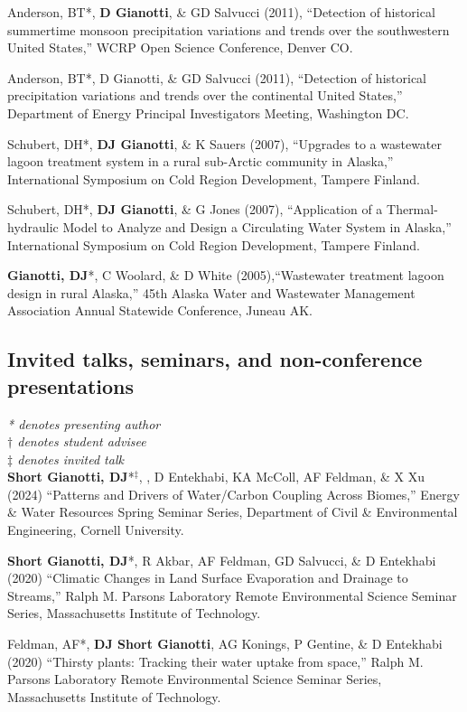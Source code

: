 \documentclass[10pt, a4paper]{article}
\renewcommand{\emph}[1]{\textit{#1}}
\newcommand{\lbr}{\vspace*{12pt}}
\newcommand{\years}[1]{\mbox{}\marginnote{\scriptsize #1}} %
\begin{document}
\years{2011}Anderson, BT*, \textbf{D Gianotti}, \& GD Salvucci (2011), ``Detection of historical summertime monsoon precipitation variations and trends over the southwestern United States,'' WCRP Open Science Conference, Denver CO.\lbr

\years{2011}Anderson, BT*, D Gianotti, \& GD Salvucci (2011), ``Detection of historical precipitation variations and trends over the continental United States,'' Department of Energy Principal Investigators Meeting, Washington DC.\lbr

\years{2007}Schubert, DH*, \textbf{DJ Gianotti}, \& K Sauers (2007), ``Upgrades to a  wastewater lagoon treatment system in a rural sub-Arctic community in Alaska,'' International Symposium on Cold Region Development, Tampere Finland.\lbr

\years{2007}Schubert, DH*, \textbf{DJ Gianotti}, \& G Jones (2007), ``Application of a Thermal-hydraulic Model to Analyze and Design a Circulating Water System in Alaska,'' International Symposium on Cold Region Development, Tampere Finland.\lbr

\years{2005}\textbf{Gianotti, DJ}*, C Woolard, \& D White (2005),``Wastewater treatment lagoon design in rural Alaska,'' 45th Alaska Water and Wastewater Management Association Annual Statewide Conference, Juneau AK.\lbr


\subsection*{Invited talks, seminars, and non-conference presentations}
\emph{* denotes presenting author}
\\ \emph{$\dagger$ denotes student advisee}
\\ \emph{$\ddag$ denotes invited talk}\\
\years{2024}\textbf{Short Gianotti, DJ}*$^\ddag$, , D Entekhabi, KA McColl, AF Feldman, \& X Xu (2024) ``Patterns and Drivers of Water/Carbon Coupling Across Biomes,'' Energy \& Water Resources Spring Seminar Series, Department of Civil \& Environmental Engineering, Cornell University.\lbr %

\years{2020}\textbf{Short Gianotti, DJ}*, R Akbar, AF Feldman, GD Salvucci, \& D Entekhabi (2020) ``Climatic Changes in Land Surface Evaporation and Drainage to Streams,'' Ralph M. Parsons Laboratory Remote Environmental Science Seminar Series, Massachusetts Institute of Technology.\lbr %

\years{2020}Feldman, AF*, \textbf{DJ Short Gianotti}, AG Konings, P Gentine, \& D Entekhabi (2020) ``Thirsty plants: Tracking their water uptake from space,'' Ralph M. Parsons Laboratory Remote Environmental Science Seminar Series, Massachusetts Institute of Technology.\lbr %
			
\end{document}
